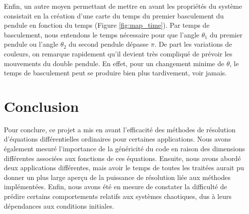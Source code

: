 Enfin, un autre moyen permettant de mettre en avant les propriétés du système consistait en la création d'une carte du temps du premier basculement du pendule en fonction du temps (Figure \ref{fig:map_time}). Par temps de basculement, nous entendons le temps nécessaire pour que l'angle $\theta_1$ du premier pendule ou l'angle $\theta_2$ du second pendule dépasse $\pi$. De part les variations de couleurs, on remarque rapidement qu'il devient très compliqué de prévoir les mouvements du double pendule. En effet, pour un changement minime de $\theta$, le temps de basculement peut se produire bien plus tardivement, voir jamais.


\section{Conclusion}
Pour conclure, ce projet a mis en avant l'efficacité des méthodes de résolution d'équations différentielles ordinaires pour certaines applications. Nous avons également mesuré l'importance de la généricité du code en raison des dimensions différentes associées aux fonctions de ces équations. Ensuite, nous avons abordé deux applications différentes, mais avoir le temps de toutes les traitées aurait pu donner un plus large aperçu de la puissance de résolution liée aux méthodes implémentées. Enfin, nous avons été en mesure de constater la difficulté de prédire certains comportements relatifs aux systèmes chaotiques, dus à leurs dépendances aux conditions initiales.